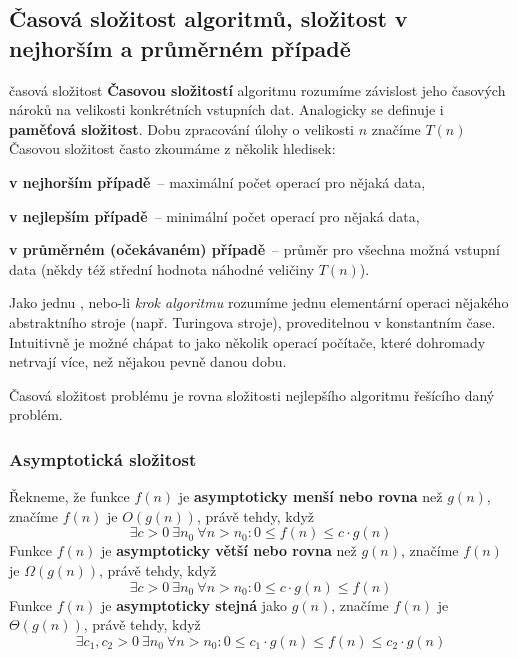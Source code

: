 \subsection{Časová složitost algoritmů, složitost v nejhorším a průměrném případě}


\begin{definiceN}{časová složitost}
  \textbf{Časovou složitostí} algoritmu rozumíme závislost jeho časových nároků na
  velikosti konkrétních vstupních dat. Analogicky se definuje i \textbf{paměťová
  složitost}. Dobu zpracování úlohy o velikosti $n$ značíme $T(n)$\\
  Časovou složitost často zkoumáme z několik hledisek:
  \begin{pitemize}
    \item \textbf{v nejhorším případě}~-- maximální počet operací pro nějaká data, 
    \item \textbf{v nejlepším případě}~-- minimální počet operací pro nějaká data,
    \item \textbf{v průměrném (očekávaném) případě}~-- průměr pro všechna možná
  vstupní data (někdy též střední hodnota náhodné veličiny $T(n)$).
  \end{pitemize}

  \begin{poznamka}
  Jako jednu , nebo-li \emph{krok algoritmu} rozumíme jednu elementární 
  operaci nějakého abstraktního stroje (např. Turingova stroje), proveditelnou v 
  konstantním čase. Intuitivně
  je možné chápat to jako několik operací počítače, které dohromady netrvají více,
  než nějakou pevně danou dobu.
  \end{poznamka}
\end{definiceN}

\begin{poznamka}
  Časová složitost problému je rovna složitosti nejlepšího algoritmu řešícího
  daný problém.
\end{poznamka}

\pagebreak[4]
\subsubsection*{Asymptotická složitost}

\begin{definice}
  Řekneme, že funkce $f(n)$ je \textbf{asymptoticky menší nebo rovna} než $g(n)$,
  značíme $f(n)$ je $O(g(n))$, právě tehdy, když
  $$ \exists c>0\ \exists n_0\ \forall n>n_0: 0 \leq f(n) \leq c \cdot g(n)$$
  Funkce $f(n)$ je \textbf{asymptoticky větší nebo rovna} než $g(n)$, značíme
  $f(n)$ je $\Omega(g(n))$, právě tehdy, když
  $$ \exists c>0\ \exists n_0\ \forall n>n_0: 0 \leq c \cdot g(n) \leq f(n)$$
  Funkce $f(n)$ je \textbf{asymptoticky stejná} jako $g(n)$, značíme $f(n)$ je
  $\Theta(g(n))$, právě tehdy, když
  $$ \exists c_1,c_2>0\ \exists n_0\ \forall n>n_0: 0 \leq c_1 \cdot g(n) \leq
  f(n) \leq c_2 \cdot g(n)$$
\end{definice}

